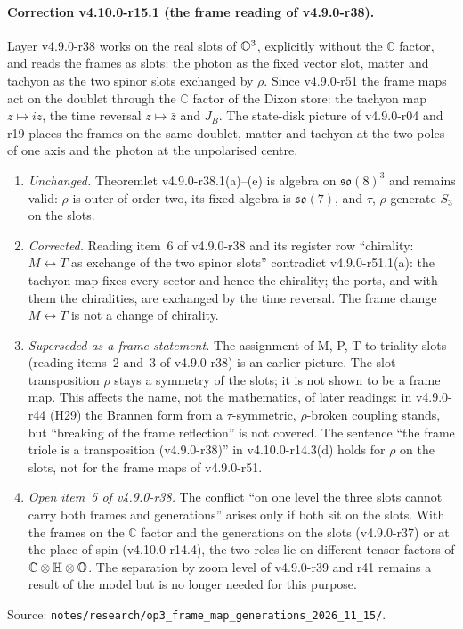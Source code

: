 \paragraph{Correction v4.10.0-r15.1 (the frame reading of v4.9.0-r38).}
Layer v4.9.0-r38 works on the real slots of \(\mathbb{O}^3\), explicitly without the \(\mathbb C\) factor, and reads the frames as
slots: the photon as the fixed vector slot, matter and tachyon as the two spinor slots exchanged by \(\rho\).  Since
v4.9.0-r51 the frame maps act on the doublet through the \(\mathbb C\) factor of the Dixon store: the tachyon map
\(z\mapsto iz\), the time reversal \(z\mapsto\bar z\) and \(J_B\).  The state-disk picture of v4.9.0-r04 and r19 places the
frames on the same doublet, matter and tachyon at the two poles of one axis and the photon at the unpolarised centre.
\begin{enumerate}[leftmargin=2em]
\item[(a)] \emph{Unchanged.}  Theoremlet v4.9.0-r38.1(a)--(e) is algebra on \(\mathfrak{so}(8)^3\) and remains valid: \(\rho\) is outer of
order two, its fixed algebra is \(\mathfrak{so}(7)\), and \(\tau\), \(\rho\) generate \(S_3\) on the slots.
\item[(b)] \emph{Corrected.}  Reading item~6 of v4.9.0-r38 and its register row ``chirality: \(M\leftrightarrow T\) as exchange of the two
spinor slots'' contradict v4.9.0-r51.1(a): the tachyon map fixes every sector and hence the chirality; the ports, and with them
the chiralities, are exchanged by the time reversal.  The frame change \(M\leftrightarrow T\) is not a change of chirality.
\item[(c)] \emph{Superseded as a frame statement.}  The assignment of M, P, T to triality slots (reading items~2 and~3 of
v4.9.0-r38) is an earlier picture.  The slot transposition \(\rho\) stays a symmetry of the slots; it is not shown to be a frame
map.  This affects the name, not the mathematics, of later readings: in v4.9.0-r44 (H29) the Brannen form from a
\(\tau\)-symmetric, \(\rho\)-broken coupling stands, but ``breaking of the frame reflection'' is not covered.  The sentence ``the
frame triole is a transposition (v4.9.0-r38)'' in v4.10.0-r14.3(d) holds for \(\rho\) on the slots, not for the frame maps of
v4.9.0-r51.
\item[(d)] \emph{Open item~5 of v4.9.0-r38.}  The conflict ``on one level the three slots cannot carry both frames and generations''
arises only if both sit on the slots.  With the frames on the \(\mathbb C\) factor and the generations on the slots (v4.9.0-r37) or at
the place of spin (v4.10.0-r14.4), the two roles lie on different tensor factors of \(\mathbb C\otimes\mathbb{H}\otimes\mathbb{O}\).  The
separation by zoom level of v4.9.0-r39 and r41 remains a result of the model but is no longer needed for this purpose.
\end{enumerate}
Source: \texttt{notes/\allowbreak research/\allowbreak op3\_frame\_map\_generations\_2026\_11\_15/}.

